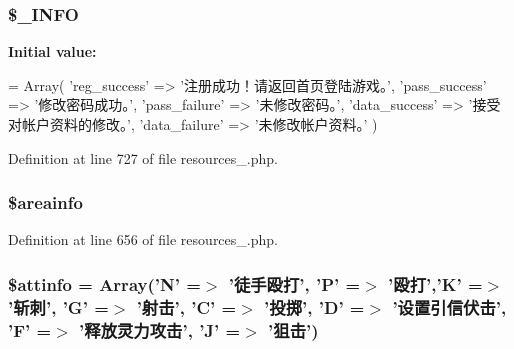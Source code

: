 \hypertarget{resources__1_8php_acc171a42cb2c06ea14b041fc55b5cc24}{
\subsubsection[{\$\+\_\+\+I\+N\+F\+O}]{\setlength{\rightskip}{0pt plus 5cm}\$\+\_\+\+I\+N\+F\+O}}\label{resources__1_8php_acc171a42cb2c06ea14b041fc55b5cc24}
{\bfseries Initial value\+:}
\begin{DoxyCode}
= Array(
    \textcolor{stringliteral}{'reg\_success'} => \textcolor{stringliteral}{'注册成功！请返回首页登陆游戏。'},
    \textcolor{stringliteral}{'pass\_success'} => \textcolor{stringliteral}{'修改密码成功。'},
    \textcolor{stringliteral}{'pass\_failure'} => \textcolor{stringliteral}{'未修改密码。'},
    \textcolor{stringliteral}{'data\_success'} => \textcolor{stringliteral}{'接受对帐户资料的修改。'},
    \textcolor{stringliteral}{'data\_failure'} => \textcolor{stringliteral}{'未修改帐户资料。'}
)
\end{DoxyCode}


Definition at line 727 of file resources\+\_.\+php.

\hypertarget{resources__1_8php_aabf13bd9fe14d8a463c5f4b334361291}{
\subsubsection[{\$areainfo}]{\setlength{\rightskip}{0pt plus 5cm}\$areainfo}}\label{resources__1_8php_aabf13bd9fe14d8a463c5f4b334361291}


Definition at line 656 of file resources\+\_.\+php.

\hypertarget{resources__1_8php_a92eb8a09b2b4554f7502c542f0cdf0d6}{
\subsubsection[{\$attinfo}]{\setlength{\rightskip}{0pt plus 5cm}\$attinfo = Array('N' =$>$ '徒手殴打', 'P' =$>$ '殴打','K' =$>$ '斩刺', 'G' =$>$ '射击', 'C' =$>$ '投掷', 'D' =$>$ '设置引信伏击', 'F' =$>$ '释放灵力攻击', 'J' =$>$ '狙击')}}\label{resources__1_8php_a92eb8a09b2b4554f7502c542f0cdf0d6}


